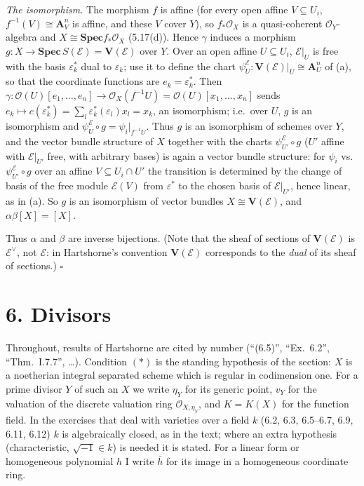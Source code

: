 \documentclass[11pt]{article}
\begin{document}
\emph{The isomorphism.} The morphism $f$ is affine (for every open affine $V\subseteq U_i$, $f^{-1}(V)\cong\mathbf A^n_V$ is affine, and these $V$ cover $Y$), so $f_*\mathcal O_X$ is a quasi-coherent $\mathcal O_Y$-algebra and $X\cong\mathbf{Spec}f_*\mathcal O_X$ (5.17(d)). Hence $\gamma$ induces a morphism $g:X\to\mathbf{Spec}\,S(\mathcal E)=\mathbf V(\mathcal E)$ over $Y$. Over an open affine $U\subseteq U_i$, $\mathcal E|_U$ is free with the basis $\varepsilon_k^*$ dual to $\varepsilon_k$; use it to define the chart $\psi^{\mathcal E}_U:\mathbf V(\mathcal E)|_U\cong\mathbf A^n_U$ of (a), so that the coordinate functions are $e_k=\varepsilon_k^*$. Then $\gamma:\mathcal O(U)[e_1,\dots,e_n]\to\mathcal O_X(f^{-1}U)=\mathcal O(U)[x_1,\dots,x_n]$ sends $e_k\mapsto c(\varepsilon_k^*)=\sum_l\varepsilon_k^*(\varepsilon_l)x_l=x_k$, an isomorphism; i.e.\ over $U$, $g$ is an isomorphism and $\psi^{\mathcal E}_U\circ g=\psi_i|_{f^{-1}U}$. Thus $g$ is an isomorphism of schemes over $Y$, and the vector bundle structure of $X$ together with the charts $\psi^{\mathcal E}_{U'}\circ g$ ($U'$ affine with $\mathcal E|_{U'}$ free, with arbitrary bases) is again a vector bundle structure: for $\psi_i$ vs.\ $\psi^{\mathcal E}_{U'}\circ g$ over an affine $V\subseteq U_i\cap U'$ the transition is determined by the change of basis of the free module $\mathcal E(V)$ from $\varepsilon^*$ to the chosen basis of $\mathcal E|_{U'}$, hence linear, as in (a). So $g$ is an isomorphism of vector bundles $X\cong\mathbf V(\mathcal E)$, and $\alpha\beta[X]=[X]$.

Thus $\alpha$ and $\beta$ are inverse bijections. (Note that the sheaf of sections of $\mathbf V(\mathcal E)$ is $\mathcal E^\vee$, not $\mathcal E$: in Hartshorne's convention $\mathbf V(\mathcal E)$ corresponds to the \emph{dual} of its sheaf of sections.) \hfill$\square$

\section*{6. Divisors}

Throughout, results of Hartshorne are cited by number (``(6.5)'', ``Ex.~6.2'', ``Thm.~I.7.7'', \dots). Condition $(*)$ is the standing hypothesis of the section: $X$ is a noetherian integral separated scheme which is regular in codimension one. For a prime divisor $Y$ of such an $X$ we write $\eta_Y$ for its generic point, $v_Y$ for the valuation of the discrete valuation ring $\mathcal O_{X,\eta_Y}$, and $K=K(X)$ for the function field. In the exercises that deal with varieties over a field $k$ (6.2, 6.3, 6.5--6.7, 6.9, 6.11, 6.12) $k$ is algebraically closed, as in the text; where an extra hypothesis (characteristic, $\sqrt{-1}\in k$) is needed it is stated. For a linear form or homogeneous polynomial $h$ I write $\bar h$ for its image in a homogeneous coordinate ring.
\end{document}
